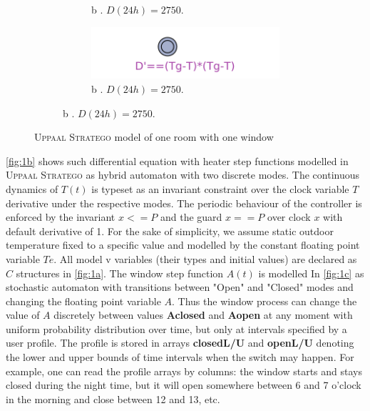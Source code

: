 \begin{figure}[!htb]
\begin{subfigure}{0.35\textwidth}
\begin{subfigure}{\textwidth}
            \caption{b . $D(24h)=2750$.} \label{fig:1c}
          \end{subfigure}
          \begin{subfigure}{\textwidth}
            \includegraphics[width=\linewidth]{images/distancetogoal.png}
            \caption{b . $D(24h)=2750$.} \label{fig:1d}
          \end{subfigure}     

      \end{subfigure}
      
      \caption{\textsc{Uppaal Stratego} model of one room with one window}
    \end{figure}

    \autoref{fig:1b} shows such differential equation with heater step functions 
    modelled in \textsc{Uppaal Stratego} as hybrid automaton with two discrete 
    modes. The continuous dynamics of $T(t)$ is typeset as an invariant constraint over the 
    clock variable $T$ derivative under the respective modes. The periodic 
    behaviour of the controller is enforced by the invariant $x<=P$ and the guard $x==P$
    over clock $x$ with default derivative of 1. For the sake of simplicity,
    we assume static outdoor temperature fixed to a specific value and 
    modelled by the constant floating point variable $Te$. All model v
    variables (their types and initial values) are declared as $C$ structures
    in \autoref{fig:1a}. The window step function $A(t)$ is modelled In
    \autoref{fig:1c} as stochastic automaton with transitions between "Open"
    and "Closed" modes and changing the floating point variable $A$. Thus
    the window process can change the value of $A$ discretely between values
    \textbf{Aclosed} and \textbf{Aopen} at any moment with uniform probability 
    distribution over time, but only at intervals specified by a user 
    profile. The profile is stored in arrays \textbf{closedL/U} and \textbf{openL/U}
    denoting the lower and upper bounds of time intervals when the switch 
    may happen. For example, one can read the profile arrays by columns:
    the window starts and stays closed during the night time, but it will 
    open somewhere between 6 and 7 o'clock in the morning and close between
    12 and 13, etc. 

